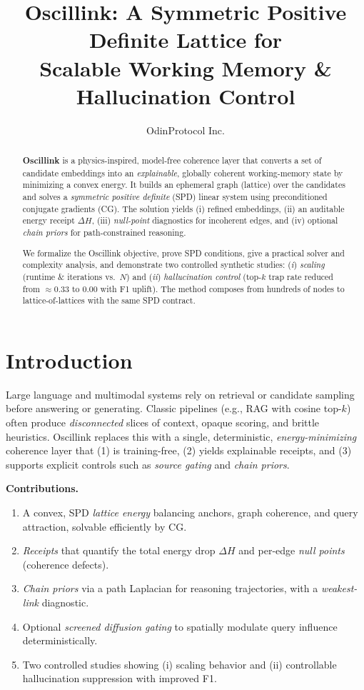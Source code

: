\documentclass[11pt]{article}
\title{\vspace{-1.0em}
Oscillink: A Symmetric Positive Definite Lattice for\\
Scalable Working Memory \& Hallucination Control
\vspace{0.25em}}
\author{OdinProtocol Inc.\vspace{-0.5em}}
\date{}
\begin{document}
\maketitle

\begin{abstract}
\noindent
\textbf{Oscillink} is a physics-inspired, model-free coherence layer that converts a set of candidate embeddings into an \emph{explainable}, globally coherent working-memory state by minimizing a convex energy. It builds an ephemeral graph (lattice) over the candidates and solves a \emph{symmetric positive definite} (SPD) linear system using preconditioned conjugate gradients (CG). The solution yields (i) refined embeddings, (ii) an auditable energy receipt $\Delta H$, (iii) \emph{null-point} diagnostics for incoherent edges, and (iv) optional \emph{chain priors} for path-constrained reasoning. 

We formalize the Oscillink objective, prove SPD conditions, give a practical solver and complexity analysis, and demonstrate two controlled synthetic studies: (\emph{i}) \emph{scaling} (runtime $\&$ iterations vs.~$N$) and (\emph{ii}) \emph{hallucination control} (top-$k$ trap rate reduced from $\approx 0.33$ to $0.00$ with F1 uplift). The method composes from hundreds of nodes to lattice-of-lattices with the same SPD contract.
\end{abstract}

\vspace{-0.75em}
\section{Introduction}
Large language and multimodal systems rely on retrieval or candidate sampling before answering or generating. Classic pipelines (e.g., RAG with cosine top-$k$) often produce \emph{disconnected} slices of context, opaque scoring, and brittle heuristics. Oscillink replaces this with a single, deterministic, \emph{energy-minimizing} coherence layer that (1) is training-free, (2) yields explainable receipts, and (3) supports explicit controls such as \emph{source gating} and \emph{chain priors}. 

\vspace{0.25em}
\noindent
\textbf{Contributions.}
\begin{enumerate}
  \item A convex, SPD \emph{lattice energy} balancing anchors, graph coherence, and query attraction, solvable efficiently by CG.
  \item \emph{Receipts} that quantify the total energy drop $\Delta H$ and per-edge \emph{null points} (coherence defects).
  \item \emph{Chain priors} via a path Laplacian for reasoning trajectories, with a \emph{weakest-link} diagnostic.
  \item Optional \emph{screened diffusion gating} to spatially modulate query influence deterministically.
  \item Two controlled studies showing (i) scaling behavior and (ii) controllable hallucination suppression with improved F1.
\end{enumerate}
\end{document}
